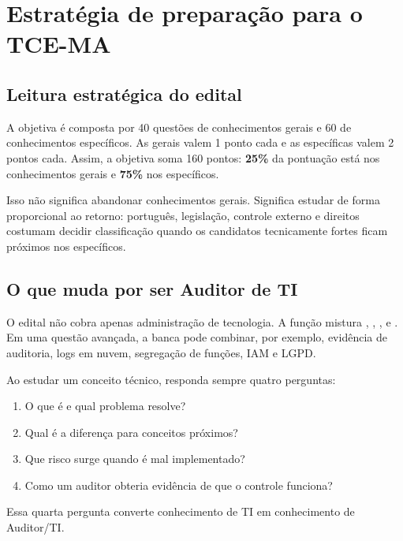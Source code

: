\chapter{Estratégia de preparação para o TCE-MA}

\section{Leitura estratégica do edital}

\begin{teoria}
A objetiva é composta por 40 questões de conhecimentos gerais e 60 de conhecimentos específicos. As gerais valem 1 ponto cada e as específicas valem 2 pontos cada. Assim, a objetiva soma 160 pontos: \textbf{25\%} da pontuação está nos conhecimentos gerais e \textbf{75\%} nos específicos.

Isso não significa abandonar conhecimentos gerais. Significa estudar de forma proporcional ao retorno: português, legislação, controle externo e direitos costumam decidir classificação quando os candidatos tecnicamente fortes ficam próximos nos específicos.
\end{teoria}

\begin{center}
\end{center}

\section{O que muda por ser Auditor de TI}

O edital não cobra apenas administração de tecnologia. A função mistura , , ,  e . Em uma questão avançada, a banca pode combinar, por exemplo, evidência de auditoria, logs em nuvem, segregação de funções, IAM e LGPD.

\begin{cebraspe}
Ao estudar um conceito técnico, responda sempre quatro perguntas:
\begin{enumerate}
\item O que é e qual problema resolve?
\item Qual é a diferença para conceitos próximos?
\item Que risco surge quando é mal implementado?
\item Como um auditor obteria evidência de que o controle funciona?
\end{enumerate}
Essa quarta pergunta converte conhecimento de TI em conhecimento de Auditor/TI.
\end{cebraspe}

